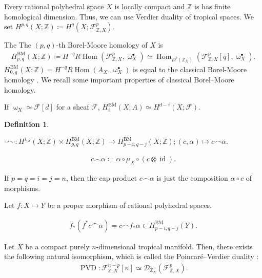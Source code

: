 \documentclass[a4paper,dvipdfmx,reqno,12pt]{amsart}
\theoremstyle{definition}
\newtheorem{definition}[theorem]{Definition}
\newcommand{\deq}{\coloneqq}
\newcommand{\Z}{\mathbb{Z}}%
\newcommand{\mcal}[1]{\mathcal{#1}}%
\newcommand{\opn}[1]{\operatorname{#1}}
\numberwithin{equation}{section}
\begin{document}
Every rational polyhedral space $X$ is locally compact and $\Z$ is has finite homological dimension.
Thus, we can use Verdier duality of tropical spaces.
We set $H^{p,q}(X;\mathbb{Z})\deq 
H^{q}(X;\mathcal{F}_{\mathbb{Z},X}^{p})$.



The The $(p,q)$-th Borel-Moore homology of $X$ is
\begin{align}
H^{\opn{BM}}_{p,q}(X;\Z)\deq 
H^{-q}R\opn{Hom}(\mathcal{F}_{\mathbb{Z},X}^{p},\upomega_X^{\bullet})\simeq 
\opn{Hom}_{D^{b}(\mathbb{Z}_X)}(\mathcal{F}_{\mathbb{Z},X}^{p}[q],\upomega_X^{\bullet}).
\end{align}
$H_{0,q}^{\opn{BM}}(X;\Z)=
H^{-q}R\opn{Hom}(A_X,\upomega_X^{\bullet})$ is equal to the classical Borel-Moore homology
\cite[Lemma 4.8]{gross2019sheaftheoretic}.
We recall some important properties of 
classical Borel--Moore homology.

If $\upomega_X\simeq \mcal{F}[d]$ for a sheaf $\mcal{F}$,
$H_i^{\opn{BM}}(X;A)\simeq H^{d-i}(X;\mcal{F})$.

\begin{definition}
  
\end{definition}

$\cdot \frown \cdot \colon
H^{i,j}(X;\mathbb{Z}) \times 
H_{p,q}^{\opn{BM}}(X;\mathbb{Z})\to 
H_{p-i,q-j}^{\opn{BM}}(X;\mathbb{Z});(c,\alpha) \mapsto c\frown \alpha$.

\begin{align}
c\frown \alpha \deq  \alpha\circ \mu_X \circ 
(c\otimes \opn{id}).
\end{align}

If $p=q=i=j=n$, then the cap product $c\frown \alpha$ 
is just the composition $\alpha \circ c$ of 
morphisms.

Let $f\colon X \to Y $ be a proper morphism of 
rational polyhedral spaces.

\begin{align}
  f_*(f^{*}c\frown \alpha)=
c\frown f_*\alpha\in H_{p-i,q-j}^{\opn{BM}}(Y).
\end{align}



Let $X$ be a compact
purely $n$-dimensional tropical manifold.
Then, there exists the following natural isomorphism, 
which is called the Poincar\'e--Verdier duality 
\cite[Theorem 6.2]{gross2019sheaftheoretic}:
\begin{align}
\opn{PVD}\colon \mathcal{F}_{\mathbb{Z},X}^{n-p}[n]
\simeq 
\mathcal{D}_{\mathbb{Z}_X}(\mathcal{F}_{\mathbb{Z},X}^{p}).
\end{align}
\end{document}
